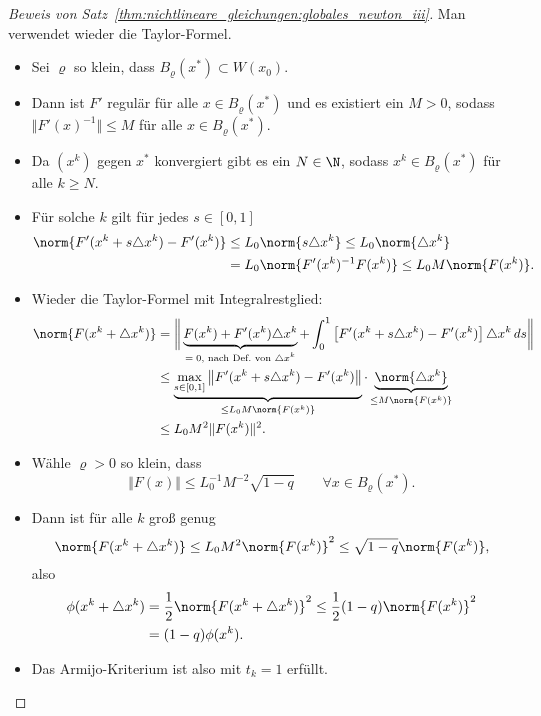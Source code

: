 \begin{proof}[Beweis von Satz~\ref{thm:nichtlineare_gleichungen:globales_newton_iii}]
Man verwendet wieder die Taylor-Formel.
\begin{itemize}
	\item Sei $\varrho$ so klein, dass $B_{\varrho} (x^* ) \subset W (x_0 )$.
	\item Dann ist $F'$ regulär für alle $x \in B_{\varrho} (x^* )$ und es existiert ein $M>0$, sodass $\Vert F'(x)^{-1} \Vert \leq M$ für alle $x \in B_{\varrho} (x^* )$.
	\item Da $(x^k)$ gegen $x^*$ konvergiert gibt es ein $N \in \N$, sodass $x^k \in B_{\varrho} (x^* )$ für alle $k \geq N$.
	\item Für solche $k$ gilt für jedes $s \in [0,1]$
	\begin{align*}
	\norm{F' (x^k+s \triangle x^k )-F' (x^k )} & \leq L_0 \norm{s \triangle x^k} \leq L_0 \norm{\triangle x^k} \\
	& = L_0 \norm{F' (x^k )^{-1}F (x^k)} \leq L_0M \norm{F (x^k)}.
  \end{align*}
 \item Wieder die Taylor-Formel  mit Integralrestglied:
  \begin{align*}
   \norm{F (x^k+\triangle x^k)}
   & =
   \bigg\Vert \underbrace{F (x^k )+F' (x^k ) \triangle x^k}_{\text{$=0$, nach Def.\ von $\triangle x^k$}}+\int_0^1 \left[F' (x^k+s \triangle x^k )-F'(x^k ) \right] \triangle x^k \,ds \bigg\Vert \\
   & \leq \underbrace{\max_{s \in [0,1]} \left\Vert F' (x^k+s \triangle x^k )-F' (x^k ) \right\Vert}_{\leq L_0M \norm{F(x^k)}} \cdot \underbrace{\norm{\triangle x^k}}_{\leq M \norm{F (x^k)}} \\
   & \leq L_0M^2 \Vert F (x^k ) \Vert^2.
  \end{align*}

 \item Wähle $\varrho>0$ so klein, dass
 \begin{equation*}
  \Vert F(x) \Vert \leq L_0^{-1}M^{-2} \sqrt{1-q} \qquad \forall x \in B_{\varrho} (x^*).
 \end{equation*}

 \item Dann ist für alle $k$ groß genug
  \begin{equation*}
   \norm{F (x^k+\triangle x^k)}
   \leq
   L_0 M^2 \norm{F(x^k)}^2
   \leq
   \sqrt{1-q} \norm{F (x^k)},
  \end{equation*}
  also
  \begin{align*}
   \phi (x^k+\triangle x^k)
   & =
   \frac{1}{2} \norm{F (x^k+\triangle x^k)}^2
   \leq
   \frac{1}{2} (1-q) \norm{F (x^k)}^2 \\
   & = (1-q) \phi (x^k).
  \end{align*}

  \item Das Armijo-Kriterium ist also mit $t_k=1$ erfüllt.
  \qedhere
\end{itemize}
\end{proof}
